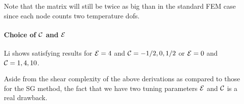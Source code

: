Note that the matrix will still be twice as big than in the standard FEM case since 
each node counts two temperature dofs. 


\paragraph{Choice of ${\cal C}$ and ${\cal E}$} Li \cite{li06}
shows satisfying results for ${\cal E}=4$ and ${\cal C}=-1/2,0,1/2$ or 
${\cal E}=0$ and ${\cal C}=1,4,10$.


\begin{remark}
Aside from the shear complexity of the above derivations as compared to those
for the SG method, the fact that we have two tuning parameters ${\cal E}$
and ${\cal C}$ is a real drawback.
\end{remark}




